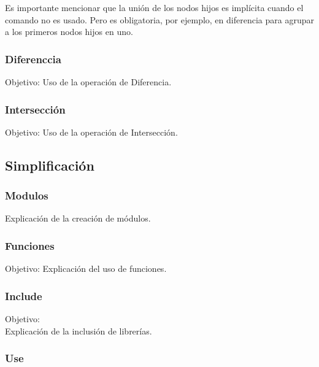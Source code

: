 \documentclass{article}
\begin{document}
Es importante mencionar que la unión de los nodos hijos es implícita cuando el comando no es usado. Pero es obligatoria, por ejemplo, en diferencia para agrupar a los primeros nodos hijos en uno.\\

\subsubsection{Diferenccia}

Objetivo: Uso de la operación de Diferencia.\citep{OpenSCS}\\

\subsubsection{Intersección}

Objetivo: Uso de la operación de Intersección.\citep{OpenSCS}\\

\subsection{Simplificación}

\subsubsection{Modulos}

Explicación de la creación de módulos.\citep{OpenSCS}\\

\subsubsection{Funciones}

Objetivo: Explicación del uso de funciones.\citep{OpenSCS}\\

\subsubsection{Include}

Objetivo:\\

Explicación de la inclusión de librerías.\citep{OpenSCS}\\

\subsubsection{Use}
\end{document}
